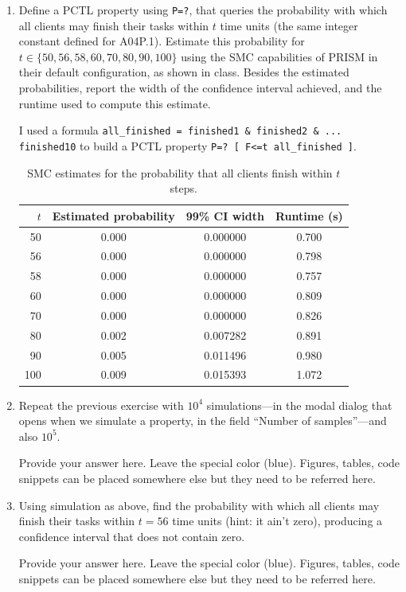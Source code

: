 \documentclass[12pt,a4paper]{article}
\begin{document}
\begin{description}
\begin{enumerate}[label=\alph*)]
\par
Using linux diagnostics, the new PRISM model crashed after 28.10 seconds with 1.29 gigabytes of memory used.
\color{black}
\fi
\color{red} \par UPLOAD REQUIRED: a prism model file  \texttt{A04P.3.a.prism}.\color{black}
%
\item Define a PCTL property using \texttt{P=?}, that queries the probability with which all clients may finish their tasks within $t$ time units (the same integer constant defined for A04P.1).
Estimate this probability for $t\in\{50,56,58,60,70,80,90,100\}$ using the SMC capabilities of PRISM in their default configuration, as shown in class.
Besides the estimated probabilities, report the width of the confidence interval achieved, and the runtime used to compute this estimate.
\ifwithanswers
\color{blue}
\par
I used a formula \texttt{all\_finished = finished1 \& finished2 \& ... finished10} to build a PCTL property \texttt{P=? [ F<=t all\_finished ]}.
\begin{table}[ht]
\color{blue}
\centering
\caption{SMC estimates for the probability that all clients finish within $t$ steps.}
\label{tab:smc-results}
\begin{tabular}{rccc}
\hline
$t$ & Estimated probability & 99\% CI width & Runtime (s) \\
\hline
50  & 0.000 & 0.000000 & 0.700 \\
56  & 0.000 & 0.000000 & 0.798 \\
58  & 0.000 & 0.000000 & 0.757 \\
60  & 0.000 & 0.000000 & 0.809 \\
70  & 0.000 & 0.000000 & 0.826 \\
80  & 0.002 & 0.007282 & 0.891 \\
90  & 0.005 & 0.011496 & 0.980 \\
100 & 0.009 & 0.015393 & 1.072 \\
\hline
\end{tabular}
\end{table}
\color{black}
\fi
%
\item Repeat the previous exercise with $10^4$ simulations---in the modal dialog that opens when we simulate a property, in the field ``Number of samples''---and also $10^5$.
\ifwithanswers
\color{blue}
\par
Provide your answer here. Leave the special color (blue). Figures, tables, code snippets can be placed somewhere else but they need to be referred here.
\color{black}
\fi
%
\item Using simulation as above, find the probability with which all clients may finish their tasks within $t=56$ time units (hint: it ain't zero), producing a confidence interval that does not contain zero.
\ifwithanswers
\color{blue}
\par
Provide your answer here. Leave the special color (blue). Figures, tables, code snippets can be placed somewhere else but they need to be referred here.
\color{black}
\fi
\end{enumerate}
%
\end{description}
\end{document}
